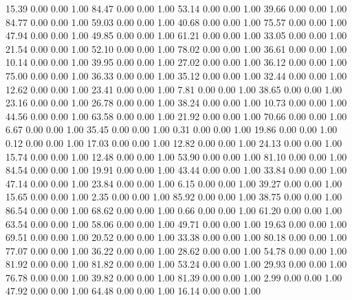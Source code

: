    15.39   0.00   0.00   1.00
   84.47   0.00   0.00   1.00
   53.14   0.00   0.00   1.00
   39.66   0.00   0.00   1.00
   84.77   0.00   0.00   1.00
   59.03   0.00   0.00   1.00
   40.68   0.00   0.00   1.00
   75.57   0.00   0.00   1.00
   47.94   0.00   0.00   1.00
   49.85   0.00   0.00   1.00
   61.21   0.00   0.00   1.00
   33.05   0.00   0.00   1.00
   21.54   0.00   0.00   1.00
   52.10   0.00   0.00   1.00
   78.02   0.00   0.00   1.00
   36.61   0.00   0.00   1.00
   10.14   0.00   0.00   1.00
   39.95   0.00   0.00   1.00
   27.02   0.00   0.00   1.00
   36.12   0.00   0.00   1.00
   75.00   0.00   0.00   1.00
   36.33   0.00   0.00   1.00
   35.12   0.00   0.00   1.00
   32.44   0.00   0.00   1.00
   12.62   0.00   0.00   1.00
   23.41   0.00   0.00   1.00
    7.81   0.00   0.00   1.00
   38.65   0.00   0.00   1.00
   23.16   0.00   0.00   1.00
   26.78   0.00   0.00   1.00
   38.24   0.00   0.00   1.00
   10.73   0.00   0.00   1.00
   44.56   0.00   0.00   1.00
   63.58   0.00   0.00   1.00
   21.92   0.00   0.00   1.00
   70.66   0.00   0.00   1.00
    6.67   0.00   0.00   1.00
   35.45   0.00   0.00   1.00
    0.31   0.00   0.00   1.00
   19.86   0.00   0.00   1.00
    0.12   0.00   0.00   1.00
   17.03   0.00   0.00   1.00
   12.82   0.00   0.00   1.00
   24.13   0.00   0.00   1.00
   15.74   0.00   0.00   1.00
   12.48   0.00   0.00   1.00
   53.90   0.00   0.00   1.00
   81.10   0.00   0.00   1.00
   84.54   0.00   0.00   1.00
   19.91   0.00   0.00   1.00
   43.44   0.00   0.00   1.00
   33.84   0.00   0.00   1.00
   47.14   0.00   0.00   1.00
   23.84   0.00   0.00   1.00
    6.15   0.00   0.00   1.00
   39.27   0.00   0.00   1.00
   15.65   0.00   0.00   1.00
    2.35   0.00   0.00   1.00
   85.92   0.00   0.00   1.00
   38.75   0.00   0.00   1.00
   86.54   0.00   0.00   1.00
   68.62   0.00   0.00   1.00
    0.66   0.00   0.00   1.00
   61.20   0.00   0.00   1.00
   63.54   0.00   0.00   1.00
   58.06   0.00   0.00   1.00
   49.71   0.00   0.00   1.00
   19.63   0.00   0.00   1.00
   69.51   0.00   0.00   1.00
   20.52   0.00   0.00   1.00
   33.38   0.00   0.00   1.00
   80.18   0.00   0.00   1.00
   77.07   0.00   0.00   1.00
   36.22   0.00   0.00   1.00
   28.62   0.00   0.00   1.00
   54.78   0.00   0.00   1.00
   81.92   0.00   0.00   1.00
   81.82   0.00   0.00   1.00
   53.24   0.00   0.00   1.00
   29.93   0.00   0.00   1.00
   76.78   0.00   0.00   1.00
   39.82   0.00   0.00   1.00
   81.39   0.00   0.00   1.00
    2.99   0.00   0.00   1.00
   47.92   0.00   0.00   1.00
   64.48   0.00   0.00   1.00
   16.14   0.00   0.00   1.00
